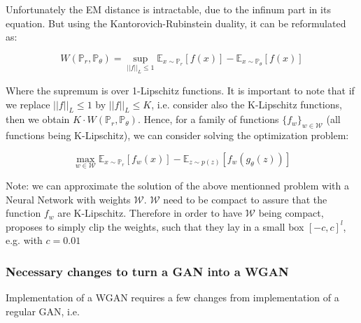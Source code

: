 \documentclass{article}
\begin{document}
Unfortunately the EM distance is intractable, due to the infinum part in its equation. But using the Kantorovich-Rubinstein duality, it can be reformulated as:



\begin{equation}
    W(\mathbb{P}_r, \mathbb{P}_{\theta}) = \sup_{||f||_L \leq 1} \mathbb{E}_{x \sim \mathbb{P}_r} [f(x)] - \mathbb{E}_{x \sim \mathbb{P}_{\theta}} [f(x)] 
\end{equation}

Where the supremum is over 1-Lipschitz functions. It is important to note that if we replace $||f||_L \leq 1$ by $||f||_L \leq K$, i.e. consider also the K-Lipschitz functions, then we obtain $K \cdot W(\mathbb{P}_r, \mathbb{P}_{\theta})$. Hence, for a family of functions $\{f_w\}_{w \in \mathcal{W}}$ (all functions being K-Lipschitz), we can consider solving the optimization problem:

\begin{equation}
    \max_{w \in \mathcal{W}}  \mathbb{E}_{x \sim \mathbb{P}_r}[f_w(x)] - \mathbb{E}_{z \sim p(z)}[f_w(g_{\theta}(z))]
\end{equation}

Note: we can approximate the solution of the above mentionned problem with a Neural Network with weights $\mathcal{W}$. $\mathcal{W}$ need to be compact to assure that the function $f_w$ are K-Lipschitz. Therefore in order to have $\mathcal{W}$ being compact, \cite{arjovsky2017wasserstein} proposes to simply clip the weights, such that they lay in a small box $[-c, c]^l$, e.g. with $c = 0.01$

\subsubsection{Necessary changes to turn a GAN into a WGAN}

Implementation of a WGAN requires a few changes from implementation of a regular GAN, i.e. 
\end{document}
